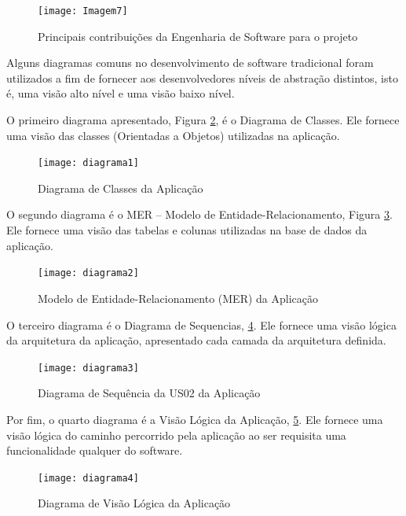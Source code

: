 		\begin{figure}[htpb]
			\centering
			\texttt{[image: Imagem7]}
			\caption{Principais contribuições da Engenharia de Software para o projeto}
			\label{Imagem7}
		\end{figure}


		Alguns diagramas comuns no desenvolvimento de software tradicional foram utilizados a fim de fornecer aos desenvolvedores níveis de abstração distintos, isto é, uma visão alto nível e uma visão baixo nível. 
		
		O primeiro diagrama apresentado, Figura \ref{diagrama1}, é o Diagrama de Classes. Ele fornece uma visão das classes (Orientadas a Objetos) utilizadas na aplicação.

		\begin{figure}[htpb]
			\centering
			\texttt{[image: diagrama1]}
			\caption{Diagrama de Classes da Aplicação}
			\label{diagrama1}
		\end{figure}

		O segundo diagrama é o MER – Modelo de Entidade-Relacionamento, Figura \ref{diagrama2}. Ele fornece uma visão das tabelas e colunas utilizadas na base de dados da aplicação.

		\begin{figure}[htpb]
			\centering
			\texttt{[image: diagrama2]}
			\caption{Modelo de Entidade-Relacionamento (MER) da Aplicação}
			\label{diagrama2}
		\end{figure}

		\newpage
		O terceiro diagrama é o Diagrama de Sequencias, \ref{diagrama3}. Ele fornece uma visão lógica da arquitetura da aplicação, apresentado cada camada da arquitetura definida.

		\begin{figure}[htpb]
			\centering
			\texttt{[image: diagrama3]}
			\caption{Diagrama de Sequência da US02 da Aplicação}
			\label{diagrama3}
		\end{figure}

		\newpage
		Por fim, o quarto diagrama é a Visão Lógica da Aplicação, \ref{diagrama4}. Ele fornece uma visão lógica do caminho percorrido pela aplicação ao ser requisita uma funcionalidade qualquer do software.

		\begin{figure}[htpb]
			\centering
			\texttt{[image: diagrama4]}
			\caption{Diagrama de Visão Lógica da Aplicação}
			\label{diagrama4}
		\end{figure}		

